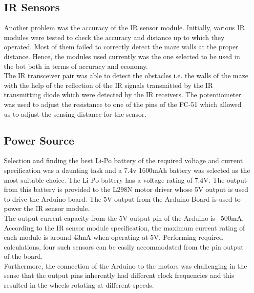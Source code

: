 \subsection{IR Sensors}
Another problem was the accuracy of the IR sensor module. Initially, various IR modules were tested to check the accuracy and distance up to which they operated. Most of them failed to correctly detect the maze walls at the proper distance. Hence, the modules used currently was the one selected to be used in the bot both in terms of accuracy and economy.\\
The IR transceiver pair was able to detect the obstacles i.e. the walls of the maze with the help of the reflection of the IR signals transmitted by the IR transmitting diode which were detected by the IR receivers. The potentiometer was used to adjust the resistance to one of the pins of the FC-51 which allowed us to adjust the sensing distance for the sensor.
\subsection{Power Source}
Selection and finding the best Li-Po battery of the required voltage and current specification was a daunting task and a 7.4v 1600mAh battery was selected as the most suitable choice. The Li-Po battery has a voltage rating of 7.4V. The output from this battery is provided to the L298N motor driver whose 5V output is used to drive the Arduino board. The 5V output from the Arduino Board is used to power the IR sensor module. \\
The output current capacity from the 5V output pin of the Arduino is ~500mA. According to the IR sensor module specification, the maximum current rating of each module is around 43mA when operating at 5V. Performing required calculations, four such sensors can be easily accommodated from the pin output of the board. \\
Furthermore, the connection of the Arduino to the motors was challenging in the sense that the output pins inherently had different clock frequencies and this resulted in the wheels rotating at different speeds. 
